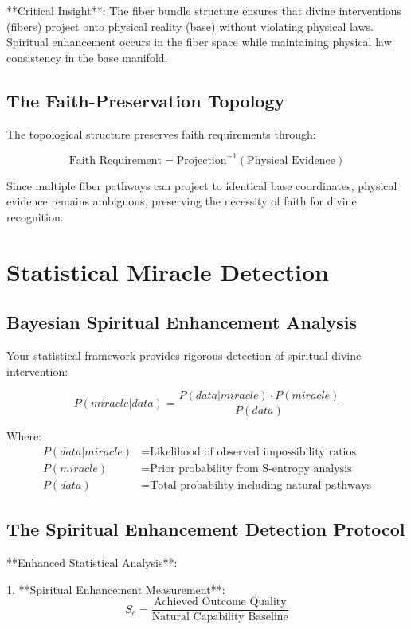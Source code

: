 \documentclass[12pt,a4paper]{article}
\begin{document}
**Critical Insight**: The fiber bundle structure ensures that divine interventions (fibers) project onto physical reality (base) without violating physical laws. Spiritual enhancement occurs in the fiber space while maintaining physical law consistency in the base manifold.

\subsection{The Faith-Preservation Topology}

The topological structure preserves faith requirements through:

$$\text{Faith Requirement} = \text{Projection}^{-1}(\text{Physical Evidence})$$

Since multiple fiber pathways can project to identical base coordinates, physical evidence remains ambiguous, preserving the necessity of faith for divine recognition.

\section{Statistical Miracle Detection}

\subsection{Bayesian Spiritual Enhancement Analysis}

Your statistical framework provides rigorous detection of spiritual divine intervention:

$$P(miracle|data) = \frac{P(data|miracle) \cdot P(miracle)}{P(data)}$$

Where:
\begin{align*}
P(data|miracle) &= \text{Likelihood of observed impossibility ratios}\\
P(miracle) &= \text{Prior probability from S-entropy analysis}\\
P(data) &= \text{Total probability including natural pathways}
\end{align*}

\subsection{The Spiritual Enhancement Detection Protocol}

**Enhanced Statistical Analysis**:

1. **Spiritual Enhancement Measurement**: 
   $$S_e = \frac{\text{Achieved Outcome Quality}}{\text{Natural Capability Baseline}}$$
\end{document}

